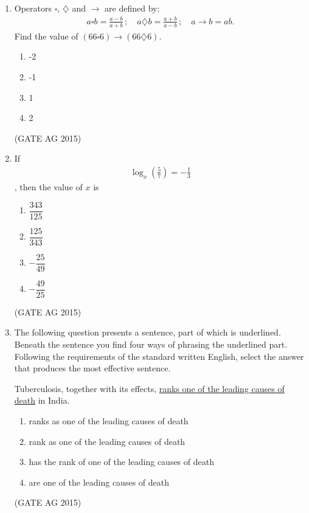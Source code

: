\documentclass[journal,12pt,onecolumn]{IEEEtran}
\theoremstyle{remark}
\begin{document}
\begin{enumerate}
\item 
Operators $\square$, $\diamondsuit$ and $\rightarrow$ are defined by: 
\begin{align*}
    a \square b = \frac{a-b}{a+b} \,;\quad a \diamondsuit b = \frac{a+b}{a-b} \,;\quad a \rightarrow b = ab.
\end{align*}
Find the value of $(66 \square 6) \rightarrow (66 \diamondsuit 6)$.\\

\begin{multicols}{4}
\begin{enumerate}
\item -2
\item -1 
\item  1 
\item  2
\end{enumerate}
\end{multicols}
\hfill{(GATE AG 2015)}

\item 
If 
\begin{align*}
    \log_{x}\left(\frac{5}{7}\right) = -\frac{1}{3}
\end{align*}
, then the value of $x$ is
\begin{multicols}{4}
\begin{enumerate}
    \item  $\dfrac{343}{125}$
    \item  $\dfrac{125}{343}$
    \item  $-\dfrac{25}{49}$
    \item  $-\dfrac{49}{25}$
\end{enumerate}
\end{multicols}
\hfill{(GATE AG 2015)}

\item 
The following question presents a sentence, part of which is underlined. Beneath the sentence you find four ways of phrasing the underlined part. Following the requirements of the standard written English, select the answer that produces the most effective sentence.

Tuberculosis, together with its effects, \underline{ranks one of the leading causes of death} in India.

\begin{enumerate}
    \item  ranks as one of the leading causes of death
    \item  rank as one of the leading causes of death
    \item  has the rank of one of the leading causes of death
    \item  are one of the leading causes of death
\end{enumerate}
\hfill{(GATE AG 2015)}


\end{enumerate}
\end{document}

